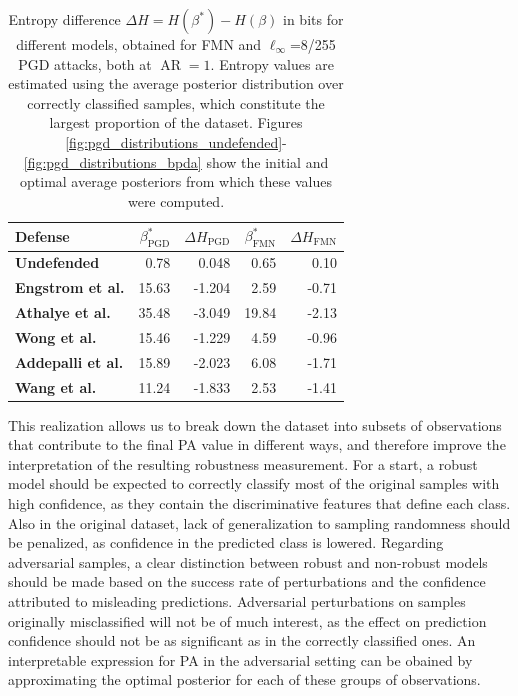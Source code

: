 \begin{table}[H]
    \centering
        \begin{tabular}{l|rr|rr}
        Defense & $\beta^{*}_{\text{PGD}}$ & $\Delta H_{\text{PGD}}$  & $\beta^{*}_{\text{FMN}}$ & $\Delta H_{\text{FMN}}$ \\
        \midrule
        {\color{tab:orange} \textbf{Undefended}} & 0.78 & 0.048 & 0.65 & 0.10\\
        {\color{tab:blue} \textbf{Engstrom et al.}} & 15.63 & -1.204 & 2.59 & -0.71\\
        {\color{tab:green} \textbf{Athalye et al.}} & 35.48 & -3.049 & 19.84 & -2.13 \\
        {\color{tab:red} \textbf{Wong et al.}} & 15.46 & -1.229 & 4.59 & -0.96\\
        {\color{tab:purple} \textbf{Addepalli et al.}} & 15.89 & -2.023 & 6.08 & -1.71 \\
        {\color{tab:brown} \textbf{Wang et al.}} & 11.24 & -1.833 & 2.53 & -1.41\\
        \bottomrule
        \end{tabular}
        \caption{
        Entropy difference $\Delta H = H(\beta^{*}) - H(\beta)$ in bits 
        for different models, obtained for FMN and $\ell_\infty$=8/255 
        PGD attacks, both at $\operatorname{AR} = 1$. Entropy values are 
        estimated using the average posterior distribution over correctly classified
        samples, which constitute the largest proportion of the dataset.
        Figures \ref{fig:pgd_distributions_undefended}-\ref{fig:pgd_distributions_bpda}
        show the initial and optimal average posteriors from which these values
        were computed.
        }
        \label{tab:entropy_gibbs}
\end{table}

This realization allows us to break down the dataset into subsets of observations
that contribute to the final PA value in different ways, and therefore improve
the interpretation of the resulting robustness measurement.
For a start, a robust model should be expected to correctly classify most of the 
original samples with high confidence, as they
contain the discriminative features that define each class. Also in the original 
dataset, lack of generalization to sampling randomness should be penalized, as confidence in
the predicted class is lowered. Regarding adversarial samples, a clear
distinction between robust and non-robust models should be made based on the success 
rate of perturbations and the confidence attributed to misleading predictions. Adversarial 
perturbations on samples originally misclassified will not be of much interest,
as the effect on prediction confidence should not be as significant as in
the correctly classified ones. An interpretable expression for PA in the adversarial
setting can be obained by approximating the optimal posterior for each of these
groups of observations. \\

